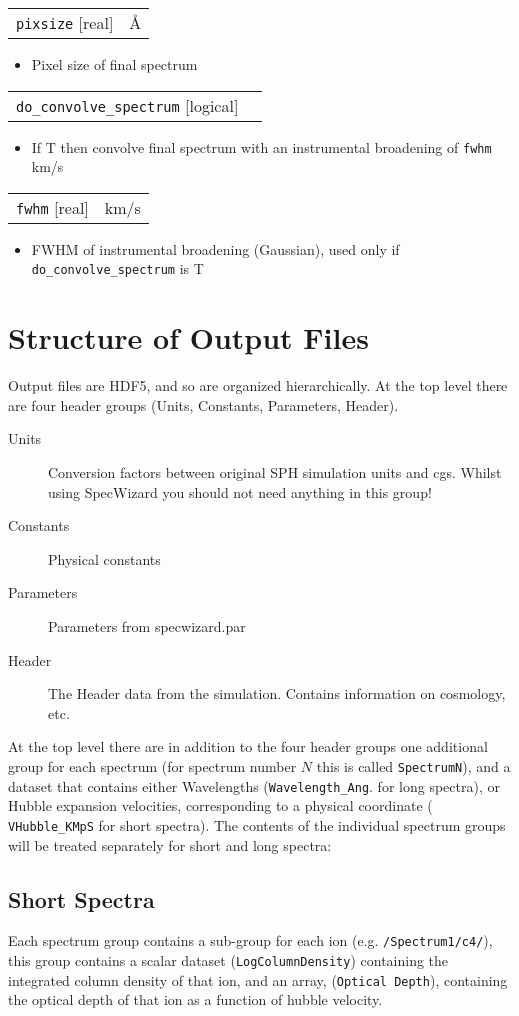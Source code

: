 \documentclass{report}
\makeatletter
\newcommand{\paramdefinition}[3]{
\begin{tabular*}{\textwidth}{l@{\extracolsep{\fill}}r}
		{\tt #1} [{\sc #2}]& #3 \\
\end{tabular*}}
\newcommand{\paramdescription}[1]{
\begin{itemize}
\item #1
\end{itemize}\vspace{0.2cm}}
\makeatother
\begin{document}
\paramdefinition{pixsize}{real}{\AA{}}
\paramdescription{Pixel size of final spectrum}

\paramdefinition{do\_convolve\_spectrum}{logical}{}
\paramdescription{If T then convolve final spectrum with an instrumental broadening of {\tt fwhm} km/s}

\paramdefinition{fwhm}{real}{km/s}
\paramdescription{FWHM of instrumental broadening (Gaussian), used only if {\tt do\_convolve\_spectrum} is T}


\chapter{Structure of Output Files}

Output files are HDF5, and so are organized hierarchically.  At the top level there are four header groups (Units, Constants, Parameters, Header).

\begin{description}
   \item[Units] Conversion factors between original SPH simulation units and cgs.  Whilst using SpecWizard you should not need anything in this group!
   \item[Constants] Physical constants
   \item[Parameters] Parameters from specwizard.par
   \item[Header] The Header data from the simulation.  Contains information on cosmology, etc.
\end{description}  

At the top level there are in addition to the four header groups one
additional group for each spectrum (for spectrum number $N$ this is
called {\tt SpectrumN}), and a dataset that contains either
Wavelengths ({\tt Wavelength\_Ang}. for long spectra), or Hubble
expansion velocities, corresponding to a physical coordinate ({\tt
  VHubble\_KMpS} for short spectra).  The contents of the individual
spectrum groups will be treated separately for short and long spectra:

\section{Short Spectra}

Each spectrum group contains a sub-group for each ion
(e.g. {\tt /Spectrum1/c4/}), this group contains a scalar dataset
({\tt LogColumnDensity}) containing the integrated column density of
that ion, and an array, ({\tt Optical Depth}), containing the optical
depth of that ion as a function of hubble velocity.
\end{document}
